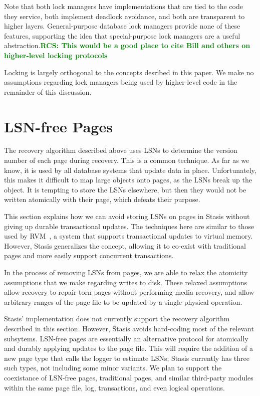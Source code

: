 \documentclass[letterpaper,twocolumn,10pt]{article}
\newcommand{\yad}{Stasis\xspace}
\newcommand{\yads}{Stasis'\xspace}
\newcommand{\rcs}[1]{\textcolor{green}{\bf RCS: #1}}
\begin{document}
Note that both lock managers have implementations that are tied to the
code they service, both implement deadlock avoidance, and both are
transparent to higher layers.  General-purpose database lock managers
provide none of these features, supporting the idea that
special-purpose lock managers are a useful abstraction.\rcs{This would
be a good place to cite Bill and others on higher-level locking
protocols}

Locking is largely orthogonal to the concepts desribed in this paper.
We make no assumptions regarding lock managers being used by higher-level code in the remainder of this discussion.



\section{LSN-free Pages}
\label{sec:lsn-free}

The recovery algorithm described above uses LSNs to determine the
version number of each page during recovery.  This is a common
technique.  As far as we know, it is used by all database systems that
update data in place.  Unfortunately, this makes it difficult to map
large objects onto pages, as the LSNs break up the object.  It
is tempting to store the LSNs elsewhere, but then they would not be
written atomically with their page, which defeats their purpose.

This section explains how we can avoid storing LSNs on pages in \yad
without giving up durable transactional updates.  The techniques here
are similar to those used by RVM~\cite{lrvm}, a system that supports
transactional updates to virtual memory.  However, \yad generalizes
the concept, allowing it to co-exist with traditional pages and more easily
support concurrent transactions.

In the process of removing LSNs from pages, we
are able to relax the atomicity assumptions that we make regarding
writes to disk.  These relaxed assumptions allow recovery to repair
torn pages without performing media recovery, and allow arbitrary
ranges of the page file to be updated by a single physical operation.

\yads implementation does not currently support the recovery algorithm
described in this section.  However, \yad avoids hard-coding most of
the relevant subsytems.  LSN-free pages are essentially an alternative
protocol for atomically and durably applying updates to the page file.
This will require the addition of a new page type that calls the
logger to estimate LSNs; \yad currently has three such types, not
including some minor variants. We plan to support the coexistance of
LSN-free pages, traditional pages, and similar third-party modules
within the same page file, log, transactions, and even logical
operations.
\end{document}
